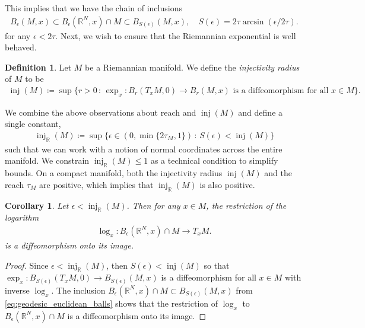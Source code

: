 \documentclass[11pt,reqno]{amsproc}
\numberwithin{equation}{section}
\newcommand{\R}{\mathbb{R}}
\newcommand{\inj}{\operatorname{inj}}
\newcommand{\ball}[3]{B_{#3}(#1, #2)} %
\newtheorem{corollary}[counter]{Corollary}
\theoremstyle{definition}
\newtheorem{definition}[counter]{Definition}
\theoremstyle{plain}
\begin{document}
    This implies that we have the chain of inclusions
    \begin{align} \label{eq:geodesic_euclidean_balls}
    \ball{M}{x}{\epsilon} \subset \ball{\R^N}{x}{\epsilon} \cap M \subset \ball{M}{x}{S(\epsilon)}, \quad S(\epsilon) = 2 \tau \arcsin(\epsilon/2\tau).
    \end{align} 
    for any $\epsilon < 2 \tau$. Next, we wish to ensure that the Riemannian exponential is well behaved.

    \begin{definition}
        Let $M$ be a Riemannian manifold. We define the \emph{injectivity radius} of $M$ to be
        \begin{align}
            \inj(M) \coloneqq \sup \Big\{ r > 0 \, : \, \exp_x: \ball{T_x M}{0}{r} \to \ball{M}{x}{r} \text{ is a diffeomorphism for all } x \in M\Big\}.
        \end{align}
    \end{definition}

    We combine the above observations about reach and $\inj(M)$ and define a single constant,
    \begin{align}
        \inj_\R(M) \coloneqq \sup\{ \epsilon \in (0, \min\{2 \tau_M, 1\}) \, : \, S(\epsilon) < \inj(M) \}
    \end{align}
    such that we can work with a notion of normal coordinates across the entire manifold. We constrain $\inj_\R(M) \leq 1$ as a technical condition to simplify bounds. On a compact manifold, both the injectivity radius $\inj(M)$ \cite[Lemma 6.16]{lee_introduction_2019-1} and the reach $\tau_M$ \cite[Prop. 14]{thale_50_2008} are positive, which implies that $\inj_\R(M)$ is also positive. 

    \begin{corollary} \label{cor:log}
        Let $\epsilon < \inj_\R(M)$. Then for any $x \in M$, the restriction of the logarithm
        \begin{align} \label{eq:restricted_log}
            \log_x : \ball{\R^N}{x}{\epsilon} \cap M \to T_x M.
        \end{align}
        is a diffeomorphism onto its image. 
    \end{corollary}
    \begin{proof}
        Since $\epsilon < \inj_\R(M)$, then $S(\epsilon) < \inj(M)$ so that $\exp_x : \ball{T_xM}{0}{S(\epsilon)} \to \ball{M}{x}{S(\epsilon)}$ is a diffeomorphism for all $x \in M$ with inverse $\log_x$. The inclusion $\ball{\R^N}{x}{\epsilon} \cap M \subset \ball{M}{x}{S(\epsilon)}$ from \eqref{eq:geodesic_euclidean_balls} shows that the restriction of $\log_x$ to $\ball{\R^N}{x}{\epsilon} \cap M$ is a diffeomorphism onto its image. 
    \end{proof}
\end{document}
